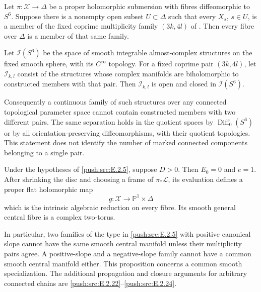 \begin{proposition}\hypertarget{tag-0338}{}\label{push:src:E.2.22}


Let $\pi:\mathcal X\to\Delta$ be a proper holomorphic
submersion with fibres diffeomorphic to $S^6$.  Suppose
there is a nonempty open subset $U\subset\Delta$ such
that every $X_s$, $s\in U$, is a member of the fixed
coprime multiplicity family $(3k,4l)$ of .
Then every fibre over $\Delta$ is a member of that
same family.
\end{proposition}

\begin{corollary}\hypertarget{tag-033A}{}\label{push:src:E.2.24}


Let $\mathcal I(S^6)$ be the space of smooth integrable
almost-complex structures on the fixed smooth sphere,
with its $C^\infty$ topology.  For a fixed coprime pair
$(3k,4l)$, let $\mathcal I_{k,l}$ consist of the structures
whose complex manifolds are biholomorphic to constructed
members with that pair.  Then $\mathcal I_{k,l}$ is open
and closed in $\mathcal I(S^6)$.

Consequently a continuous family of such structures
over any connected topological parameter space cannot
contain constructed members with two different pairs.
The same separation holds in the quotient spaces by
$\operatorname{Diff}_0(S^6)$ or by all orientation-preserving
diffeomorphisms, with their quotient topologies.
This statement does not identify the number of marked
connected components belonging to a single pair.
\end{corollary}

\begin{proposition}\hypertarget{tag-033E}{}\label{push:src:E.2.6}


Under the hypotheses of \ref{push:src:E.2.5}, suppose $D>0$.  Then $E_0=0$
and $e=1$.  After shrinking the disc and choosing a frame of
$\pi_*\mathcal L$, its evaluation defines a proper flat
holomorphic map
\[
 g:\mathcal X\longrightarrow\mathbb P^1\times\Delta
\]
which is the intrinsic algebraic reduction on every fibre.
Its smooth general central fibre is a complex two-torus.

In particular, two families of the type in \ref{push:src:E.2.5} with positive
canonical slope cannot have the same smooth central manifold
unless their multiplicity pairs agree.  A positive-slope and
a negative-slope family cannot have a common smooth central
manifold either.  This proposition concerns a common smooth
specialization.  The additional propagation and closure
arguments for arbitrary connected chains are \ref{push:src:E.2.22}--\ref{push:src:E.2.24}.
\end{proposition}

